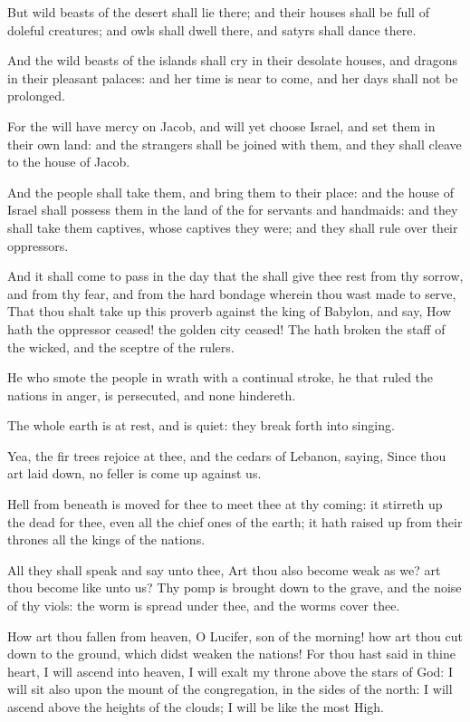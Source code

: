 \Verse But wild beasts of the desert shall lie there; and their houses shall be full of doleful creatures; and owls shall dwell there, and satyrs shall dance there.

\Verse And the wild beasts of the islands shall cry in their desolate houses, and dragons in their pleasant palaces: and her time is near to come, and her days shall not be prolonged.


\Chapter
\Verse For the \LORD will have mercy on Jacob, and will yet choose Israel, and set them in their own land: and the strangers shall be joined with them, and they shall cleave to the house of Jacob.

\Verse And the people shall take them, and bring them to their place: and the house of Israel shall possess them in the land of the \LORD for servants and handmaids: and they shall take them captives, whose captives they were; and they shall rule over their oppressors.

\Verse And it shall come to pass in the day that the \LORD shall give thee rest from thy sorrow, and from thy fear, and from the hard bondage wherein thou wast made to serve, \Verse That thou shalt take up this proverb against the king of Babylon, and say, How hath the oppressor ceased! the golden city ceased!  \Verse The \LORD hath broken the staff of the wicked, and the sceptre of the rulers.

\Verse He who smote the people in wrath with a continual stroke, he that ruled the nations in anger, is persecuted, and none hindereth.

\Verse The whole earth is at rest, and is quiet: they break forth into singing.

\Verse Yea, the fir trees rejoice at thee, and the cedars of Lebanon, saying, Since thou art laid down, no feller is come up against us.

\Verse Hell from beneath is moved for thee to meet thee at thy coming: it stirreth up the dead for thee, even all the chief ones of the earth; it hath raised up from their thrones all the kings of the nations.

\Verse All they shall speak and say unto thee, Art thou also become weak as we? art thou become like unto us?  \Verse Thy pomp is brought down to the grave, and the noise of thy viols: the worm is spread under thee, and the worms cover thee.

\Verse How art thou fallen from heaven, O Lucifer, son of the morning!  how art thou cut down to the ground, which didst weaken the nations!  \Verse For thou hast said in thine heart, I will ascend into heaven, I will exalt my throne above the stars of God: I will sit also upon the mount of the congregation, in the sides of the north: \Verse I will ascend above the heights of the clouds; I will be like the most High.

